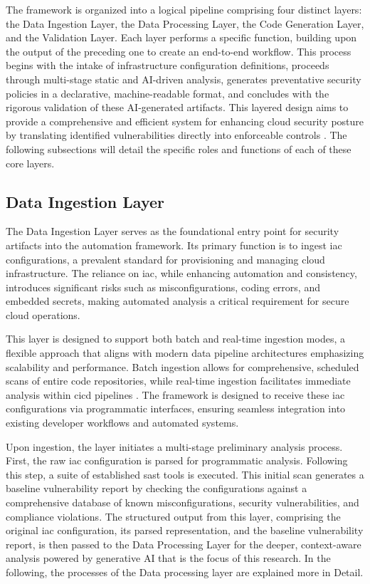 The framework is organized into a logical pipeline comprising four distinct layers: the Data Ingestion Layer, the Data Processing Layer, the Code Generation Layer, and the Validation Layer. Each layer performs a specific function, building upon the output of the preceding one to create an end-to-end workflow. This process begins with the intake of infrastructure configuration definitions, proceeds through multi-stage static and AI-driven analysis, generates preventative security policies in a declarative, machine-readable format, and concludes with the rigorous validation of these AI-generated artifacts. This layered design aims to provide a comprehensive and efficient system for enhancing cloud security posture by translating identified vulnerabilities directly into enforceable controls \cite{fakih_llm4cve_2025}. The following subsections will detail the specific roles and functions of each of these core layers.

\subsection{Data Ingestion Layer} %
\label{sec:data-ingestion-layer}

The Data Ingestion Layer serves as the foundational entry point for security artifacts into the automation framework. Its primary function is to ingest \gls{iac} configurations, a prevalent standard for provisioning and managing cloud infrastructure. The reliance on \gls{iac}, while enhancing automation and consistency, introduces significant risks such as misconfigurations, coding errors, and embedded secrets, making automated analysis a critical requirement for secure cloud operations.

This layer is designed to support both batch and real-time ingestion modes, a flexible approach that aligns with modern data pipeline architectures emphasizing scalability and performance\cite{alevizos_towards_2024}. Batch ingestion allows for comprehensive, scheduled scans of entire code repositories, while real-time ingestion facilitates immediate analysis within \gls{cicd} pipelines \cite{gunathilaka_context-aware_2025}. The framework is designed to receive these \gls{iac} configurations via programmatic interfaces, ensuring seamless integration into existing developer workflows and automated systems.

Upon ingestion, the layer initiates a multi-stage preliminary analysis process. First, the raw \gls{iac} configuration is parsed for programmatic analysis. Following this step, a suite of established \gls{sast} tools is executed. This initial scan generates a baseline vulnerability report by checking the configurations against a comprehensive database of known misconfigurations, security vulnerabilities, and compliance violations. The structured output from this layer, comprising the original \gls{iac} configuration, its parsed representation, and the baseline vulnerability report, is then passed to the Data Processing Layer for the deeper, context-aware analysis powered by generative AI that is the focus of this research. In the following, the processes of the Data processing layer are explained more in Detail.


